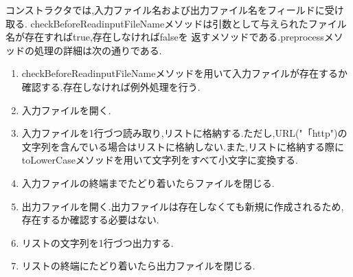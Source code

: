 \documentclass[a4j]{jarticle}
\begin{document}
コンストラクタでは,入力ファイル名および出力ファイル名をフィールドに受け取る.
checkBeforeReadinputFileNameメソッドは引数として与えられたファイル名が存在すればtrue,存在しなければfalseを
返すメソッドである.preprocessメソッドの処理の詳細は次の通りである.
\begin{enumerate}
	\item checkBeforeReadinputFileNameメソッドを用いて入力ファイルが存在するか確認する.存在しなければ例外処理を行う.
	\item 入力ファイルを開く.
	\item 入力ファイルを1行づつ読み取り,リストに格納する.ただし,URL("「http")の文字列を含んでいる場合はリストに格納しない.また,リストに格納する際に
	toLowerCaseメソッドを用いて文字列をすべて小文字に変換する.
	\item 入力ファイルの終端までたどり着いたらファイルを閉じる.
	\item 出力ファイルを開く.出力ファイルは存在しなくても新規に作成されるため,存在するか確認する必要はない.
	\item リストの文字列を1行づつ出力する.
	\item リストの終端にたどり着いたら出力ファイルを閉じる.
\end{enumerate}
\end{document}
